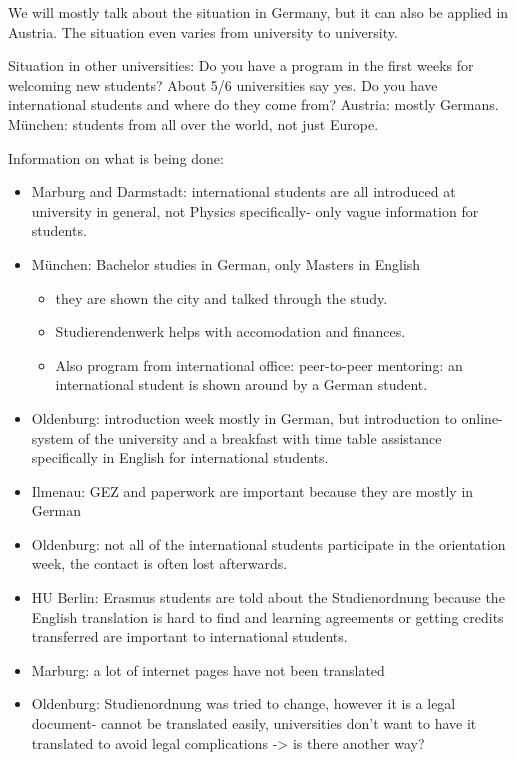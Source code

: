     We will mostly talk about the situation in Germany, but it can also be applied in Austria.
    The situation even varies from university to university.

    Situation in other universities: Do you have a program in the first weeks for welcoming new students?
    About 5/6 universities say yes.
    Do you have international students and where do they come from?
    Austria: mostly Germans. München: students from all over the world, not just Europe.

    Information on what is being done:
    \begin{itemize}
      \item Marburg and Darmstadt: international students are all introduced at university in general, not Physics specifically- only vague information for students.
      \item München: Bachelor studies in German, only Masters in English
        \begin{itemize}
          \item they are shown the city and talked through the study.
          \item Studierendenwerk helps with accomodation and finances.
          \item Also program from international office: peer-to-peer mentoring: an international student is shown around by a German student.
        \end{itemize}
      \item Oldenburg: introduction week mostly in German, but introduction to online-system of the university and a breakfast with time table assistance specifically in English for international students.
      \item Ilmenau: GEZ and paperwork are important because they are mostly in German
      \item Oldenburg: not all of the international students participate in the orientation week, the contact is often lost afterwards.
      \item HU Berlin: Erasmus students are told about the Studienordnung because the English translation is hard to find and learning agreements or getting credits transferred are important to international students.
      \item Marburg: a lot of internet pages have not been translated
      \item Oldenburg: Studienordnung was tried to change, however it is a legal document- cannot be translated easily, universities don't want to have it translated to avoid legal complications -> is there another way?

\end{itemize}
